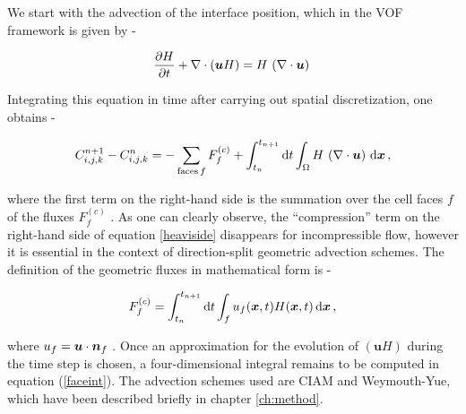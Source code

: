We start with the advection of the interface position, which in 
the VOF framework is given by - 



\begin{align}
	\frac{\partial H}{\partial t} + \nabla \cdot (\boldsymbol{u} H) = H\, \left(\nabla \cdot \boldsymbol{u} \right) \,
	\label{heaviside}
\end{align}


Integrating this equation in time after carrying 
out spatial discretization, one obtains -    




\begin{align}
{C_{i,j,k}^{n+1} - C_{i,j,k}^{n}} = - \sum_{\textrm{faces} \, f} F^{(c)}_f + \int_{t_n}^{t_{n+1}}  
	{\textrm{d}}t \int_\Omega  H \, \left(\nabla \cdot \boldsymbol{u}\right) \,  {\textrm {d}}\boldsymbol{x}   \,,
\label{sumf}
\end{align}


where the first term on the right-hand side is the summation over the cell faces $f$  
of the fluxes $F^{(c)}_f$   
 . 
As one can clearly observe, the ``compression'' term on the 
right-hand side of equation \eqref{heaviside} disappears for incompressible flow, 
however it is essential in the context of direction-split geometric advection schemes.
The definition of the geometric fluxes in mathematical form is -  

\begin{align}
	F_f^{(c)} = \int_{t_n}^{t_{n+1}} {\textrm {d}}t \int_{f} u_f(\boldsymbol{x},t) H(\boldsymbol{x},t) \, {\textrm{d}}\boldsymbol{x} \,,
\label{faceint}
\end{align}

where $u_f = \boldsymbol{u}\cdot \boldsymbol{n}_f$ 
.
Once an approximation for the evolution of $(\boldsymbol{u} H)$ during
the time step is chosen, a four-dimensional integral remains to be
computed in equation (\ref{faceint}).
The advection schemes used are CIAM and Weymouth-Yue, which have been 
described briefly in chapter \ref{ch:method}. 

